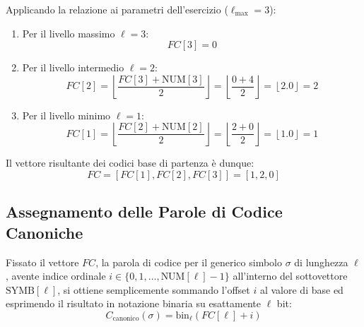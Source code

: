 Applicando la relazione ai parametri dell'esercizio ($\ell_{\max} = 3$):
\begin{enumerate}
  \item Per il livello massimo $\ell = 3$:
  \begin{equation}
    FC[3] = 0
  \end{equation}
  \item Per il livello intermedio $\ell = 2$:
  \begin{equation}
    FC[2] = \left\lfloor \frac{FC[3] + \text{NUM}[3]}{2} \right\rfloor = \left\lfloor \frac{0 + 4}{2} \right\rfloor = \left\lfloor 2.0 \right\rfloor = 2
  \end{equation}
  \item Per il livello minimo $\ell = 1$:
  \begin{equation}
    FC[1] = \left\lfloor \frac{FC[2] + \text{NUM}[2]}{2} \right\rfloor = \left\lfloor \frac{2 + 0}{2} \right\rfloor = \left\lfloor 1.0 \right\rfloor = 1
  \end{equation}
\end{enumerate}

Il vettore risultante dei codici base di partenza \`e dunque:
\begin{equation}
  FC = [FC[1], FC[2], FC[3]] = [1, 2, 0]
\end{equation}

\FloatBarrier
\subsection{Assegnamento delle Parole di Codice Canoniche}
\label{subsec:assegnamento-codici-canonici}

Fissato il vettore $FC$, la parola di codice per il generico simbolo $\sigma$ di lunghezza $\ell$, avente indice ordinale $i \in \{0, 1, \dots, \text{NUM}[\ell]-1\}$ all'interno del sottovettore $\text{SYMB}[\ell]$, si ottiene semplicemente sommando l'offset $i$ al valore di base ed esprimendo il risultato in notazione binaria su esattamente $\ell$ bit:
\begin{equation}
  C_{\text{canonico}}(\sigma) = \text{bin}_{\ell}(FC[\ell] + i)
\end{equation}

